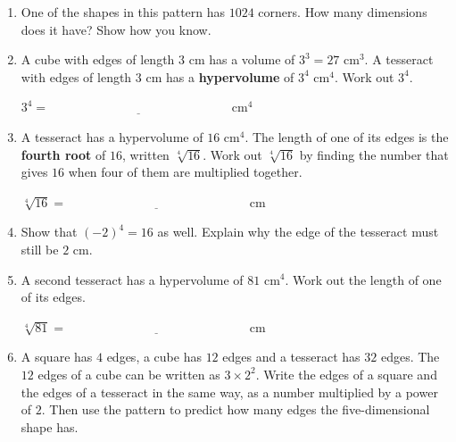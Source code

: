 \documentclass[12pt,a4paper]{article}
\newcommand{\ansline}[1][2.2cm]{\underline{\hspace{#1}}}
\begin{document}
\begin{enumerate}[resume]
\begin{enumerate}
\vspace{6pt}
  \item One of the shapes in this pattern has $1024$ corners. How many
        dimensions does it have? Show how you know.

\vspace{6pt}
\ansline[16cm]

\vspace{16pt}
\ansline[16cm]

\newpage{}

\vspace{6pt}
  \item A cube with edges of length $3$ cm has a volume of $3^3=27$ cm$^3$. A
        tesseract with edges of length $3$ cm has a \textbf{hypervolume} of
        $3^4$ cm$^4$. Work out $3^4$.

\vspace{10pt}
$3^4=\ansline[6cm]$ cm$^4$

\vspace{6pt}
  \item A tesseract has a hypervolume of $16$ cm$^4$. The length of one of its
        edges is the \textbf{fourth root} of $16$, written $\sqrt[4]{16}$.
        Work out $\sqrt[4]{16}$ by finding the number that gives $16$ when
        four of them are multiplied together.

\vspace{10pt}
$\sqrt[4]{16}=\ansline[6cm]$ cm

\vspace{6pt}
  \item Show that $(-2)^4=16$ as well. Explain why the edge of the tesseract
        must still be $2$ cm.

\vspace{6pt}
\ansline[16cm]

\vspace{16pt}
\ansline[16cm]

\vspace{6pt}
  \item A second tesseract has a hypervolume of $81$ cm$^4$. Work out the
        length of one of its edges.

\vspace{10pt}
$\sqrt[4]{81}=\ansline[6cm]$ cm

\vspace{6pt}
  \item A square has $4$ edges, a cube has $12$ edges and a tesseract has $32$
        edges. The $12$ edges of a cube can be written as $3\times2^2$. Write
        the edges of a square and the edges of a tesseract in the same way,
        as a number multiplied by a power of $2$. Then use the pattern to
        predict how many edges the five-dimensional shape has.


\end{enumerate}
\end{enumerate}
\end{document}
